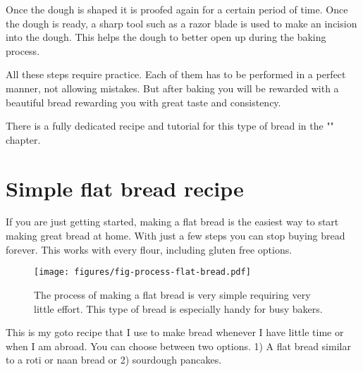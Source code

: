 Once the dough is shaped it is proofed again for a certain
period of time. Once the dough is ready, a sharp tool such
as a razor blade is used to make an incision into the dough.
This helps the dough to better open up during the baking process.

All these steps require practice. Each of them has to be
performed in a perfect manner, not allowing mistakes.
But after baking you will be rewarded with a beautiful bread
rewarding you with great taste and consistency.

There is a fully dedicated recipe and tutorial
for this type of bread in the "" chapter.

\section{Simple flat bread recipe}
\label{section:flat-bread-recipe}

If you are just getting started, making a flat bread is the
easiest way to start making great bread at home. With just a
few steps you can stop buying bread forever. This works with
every flour, including gluten free options.

\begin{figure}[!htb]
  \texttt{[image: figures/fig-process-flat-bread.pdf]}
  \caption{The process of making a flat bread is very simple requiring very little effort. This
  type of bread is especially handy for busy bakers.}
  \label{fig:flat-bread-process}
\end{figure}

This is my goto recipe that I use to make bread whenever
I have little time or when I am abroad. You can choose
between two options. 1) A flat bread similar to a roti or naan bread
or 2) sourdough pancakes.

\begin{table}[htb!]
  \centering
  \caption{\label{tab:flat-bread-ingredients}Flat breads or pancakes recipe for 1 person. Multiply the ingredients
  to increase portion size. Refer to the section \ref{section:bakers-math} "" to learn how
  to understand and use the percentages properly.} 
\end{table}


